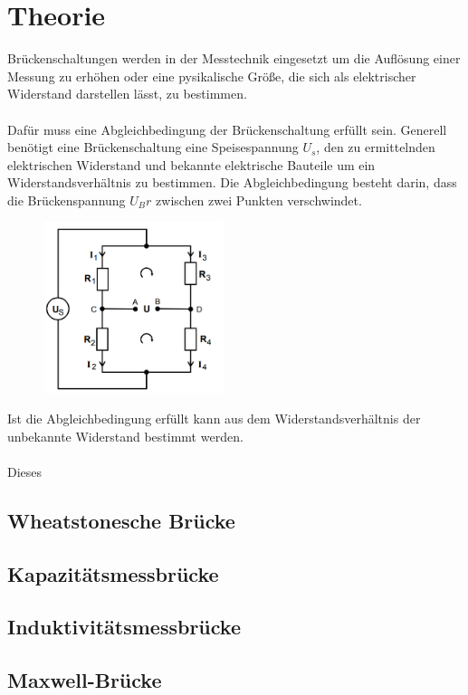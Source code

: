 \section{Theorie}
\label{sec:Theorie}
Brückenschaltungen werden in der Messtechnik 
eingesetzt um die Auflösung einer Messung zu erhöhen
oder eine pysikalische Größe,
die sich als elektrischer Widerstand darstellen lässt,
zu bestimmen. \\
\\
Dafür muss eine Abgleichbedingung der
Brückenschaltung erfüllt sein. Generell benötigt eine
Brückenschaltung eine Speisespannung $U_s$, den zu
ermittelnden elektrischen Widerstand und bekannte
elektrische Bauteile um ein Widerstandsverhältnis
zu bestimmen.
Die Abgleichbedingung besteht darin, dass die
Brückenspannung $U_Br$ zwischen zwei Punkten
verschwindet.

\begin{figure}[H]
\centering
    \includegraphics[height= 5cm]{content/Allgemein.png}
\end{figure}

\noindent Ist die Abgleichbedingung erfüllt kann aus dem
Widerstandsverhältnis der unbekannte Widerstand
bestimmt werden.\\
\\
Dieses



\subsection{Wheatstonesche Brücke}
\subsection{Kapazitätsmessbrücke}
\subsection{Induktivitätsmessbrücke}
\subsection{Maxwell-Brücke}
